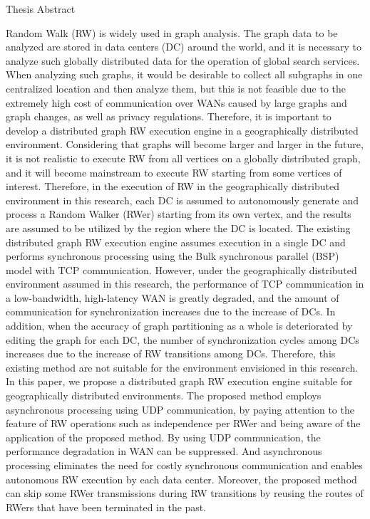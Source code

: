 \begin{center}
  \Huge{Thesis Abstract}\\
  \vspace{10pt}
  \large{}
\end{center}


Random Walk (RW) is widely used in graph analysis. The graph data to be analyzed are stored in data centers (DC) around the world, and it is necessary to analyze such globally distributed data for the operation of global search services. When analyzing such graphs, it would be desirable to collect all subgraphs in one centralized location and then analyze them, but this is not feasible due to the extremely high cost of communication over WANs caused by large graphs and graph changes, as well as privacy regulations. Therefore, it is important to develop a distributed graph RW execution engine in a geographically distributed environment. 
Considering that graphs will become larger and larger in the future, it is not realistic to execute RW from all vertices on a globally distributed graph, and it will become mainstream to execute RW starting from some vertices of interest. Therefore, in the execution of RW in the geographically distributed environment in this research, each DC is assumed to autonomously generate and process a Random Walker (RWer) starting from its own vertex, and the results are assumed to be utilized by the region where the DC is located. 
The existing distributed graph RW execution engine assumes execution in a single DC and performs synchronous processing using the Bulk synchronous parallel (BSP) model with TCP communication. However, under the geographically distributed environment assumed in this research, the performance of TCP communication in a low-bandwidth, high-latency WAN is greatly degraded, and the amount of communication for synchronization increases due to the increase of DCs. In addition, when the accuracy of graph partitioning as a whole is deteriorated by editing the graph for each DC, the number of synchronization cycles among DCs increases due to the increase of RW transitions among DCs. Therefore, this existing method are not suitable for the environment envisioned in this research.
In this paper, we propose a distributed graph RW execution engine suitable for geographically distributed environments. The proposed method employs asynchronous processing using UDP communication, by paying attention to the feature of RW operations such as independence per RWer and being aware of the application of the proposed method. By using UDP communication, the performance degradation in WAN can be suppressed. And asynchronous processing eliminates the need for costly synchronous communication and enables autonomous RW execution by each data center. Moreover, the proposed method can skip some RWer transmissions during RW transitions by reusing the routes of RWers that have been terminated in the past.
